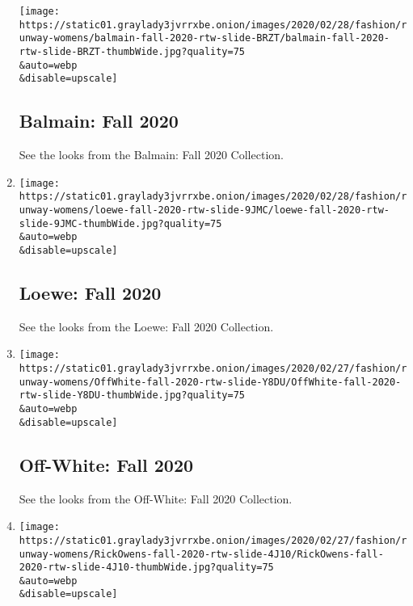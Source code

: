\begin{enumerate}
  \texttt{[image: https://static01.graylady3jvrrxbe.onion/images/2020/02/28/fashion/runway-womens/balmain-fall-2020-rtw-slide-BRZT/balmain-fall-2020-rtw-slide-BRZT-thumbWide.jpg?quality=75\\\&auto=webp\\\&disable=upscale]}

  \hypertarget{balmain-fall-2020}{%
  \subsection{Balmain: Fall 2020}\label{balmain-fall-2020}}

  See the looks from the Balmain: Fall 2020 Collection.
\item
  \href{/slideshow/2020/02/28/fashion/runway-womens/loewe-fall-2020.html}{}

  \texttt{[image: https://static01.graylady3jvrrxbe.onion/images/2020/02/28/fashion/runway-womens/loewe-fall-2020-rtw-slide-9JMC/loewe-fall-2020-rtw-slide-9JMC-thumbWide.jpg?quality=75\\\&auto=webp\\\&disable=upscale]}

  \hypertarget{loewe-fall-2020}{%
  \subsection{Loewe: Fall 2020}\label{loewe-fall-2020}}

  See the looks from the Loewe: Fall 2020 Collection.
\item
  \href{/slideshow/2020/02/27/fashion/runway-womens/off-white-fall-2020.html}{}

  \texttt{[image: https://static01.graylady3jvrrxbe.onion/images/2020/02/27/fashion/runway-womens/OffWhite-fall-2020-rtw-slide-Y8DU/OffWhite-fall-2020-rtw-slide-Y8DU-thumbWide.jpg?quality=75\\\&auto=webp\\\&disable=upscale]}

  \hypertarget{off-white-fall-2020}{%
  \subsection{Off-White: Fall 2020}\label{off-white-fall-2020}}

  See the looks from the Off-White: Fall 2020 Collection.
\item
  \href{/slideshow/2020/02/27/fashion/runway-womens/rick-owens-fall-2020.html}{}

  \texttt{[image: https://static01.graylady3jvrrxbe.onion/images/2020/02/27/fashion/runway-womens/RickOwens-fall-2020-rtw-slide-4J10/RickOwens-fall-2020-rtw-slide-4J10-thumbWide.jpg?quality=75\\\&auto=webp\\\&disable=upscale]}

  \hypertarget{rick-owens-fall-2020}{%
}
\end{enumerate}
